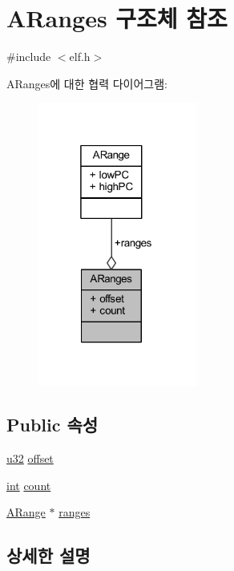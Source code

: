 \hypertarget{struct_a_ranges}{}\section{A\+Ranges 구조체 참조}
\label{struct_a_ranges}


{\ttfamily \#include $<$elf.\+h$>$}



A\+Ranges에 대한 협력 다이어그램\+:\nopagebreak
\begin{figure}[H]
\begin{center}
\leavevmode
\includegraphics[width=148pt]{struct_a_ranges__coll__graph}
\end{center}
\end{figure}
\subsection*{Public 속성}
\begin{DoxyCompactItemize}
\item 
\mbox{\hyperlink{_system_8h_a10e94b422ef0c20dcdec20d31a1f5049}{u32}} \mbox{\hyperlink{struct_a_ranges_ac9a8655acb6be1e8f52053fc49c34efa}{offset}}
\item 
\mbox{\hyperlink{_util_8cpp_a0ef32aa8672df19503a49fab2d0c8071}{int}} \mbox{\hyperlink{struct_a_ranges_a6f197b7ddb2b3cb334c2eeb9de8d7288}{count}}
\item 
\mbox{\hyperlink{struct_a_range}{A\+Range}} $\ast$ \mbox{\hyperlink{struct_a_ranges_a2eb62f0d43045767640b1d0c4dd8191e}{ranges}}
\end{DoxyCompactItemize}


\subsection{상세한 설명}


